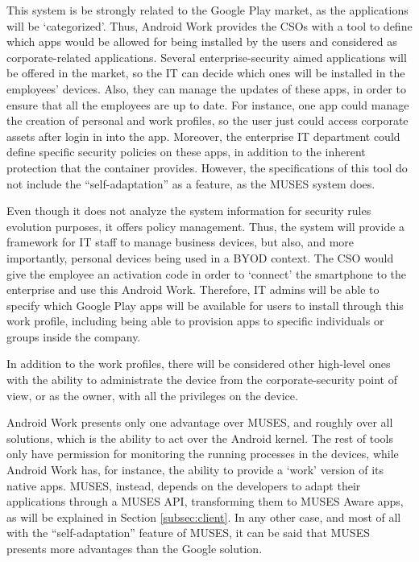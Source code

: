 This system is be strongly related to the Google Play market, as the applications will be `categorized'. Thus, Android Work provides the CSOs with a tool to define which apps would be allowed for being installed by the users and considered as corporate-related applications. Several enterprise-security aimed applications will be offered in the market, so the IT can decide which ones will be installed in the employees' devices. Also, they can manage the updates of these apps, in order to ensure that all the employees are up to date. For instance, one app could manage the creation of personal and work profiles, so the user just could access corporate assets after login in into the app. Moreover, the enterprise IT department could define specific security policies on these apps, in addition to the inherent protection that the container provides. However, the specifications of this tool \cite{AndroidWork_tool} do not include the ``self-adaptation'' as a feature, as the MUSES system does. 

Even though it does not analyze the system information for security rules evolution purposes, it offers policy management. Thus, the system will provide a framework for IT staff to manage business devices, but also, and more importantly, personal devices being used in a BYOD context. The CSO would give the employee an activation code in order to `connect' the smartphone to the enterprise and use this Android Work.
Therefore, IT admins will be able to specify which Google Play apps will be available for users to install through this work profile, including being able to provision apps to specific individuals or groups inside the company.

In addition to the work profiles, there will be considered other high-level ones with the ability to administrate the device from the corporate-security point of view, or as the owner, with all the privileges on the device.

Android Work presents only one advantage over MUSES, and roughly over all solutions, which is the ability to act over the Android kernel. The rest of tools only have permission for monitoring the running processes in the devices, while Android Work has, for instance, the ability to provide a `work' version of its native apps. MUSES, instead, depends on the developers to adapt their applications through a MUSES API, transforming them to MUSES Aware apps, as will be explained in Section \ref{subsec:client}. In any other case, and most of all with the ``self-adaptation'' feature of MUSES, it can be said that MUSES presents more advantages than the Google solution.

